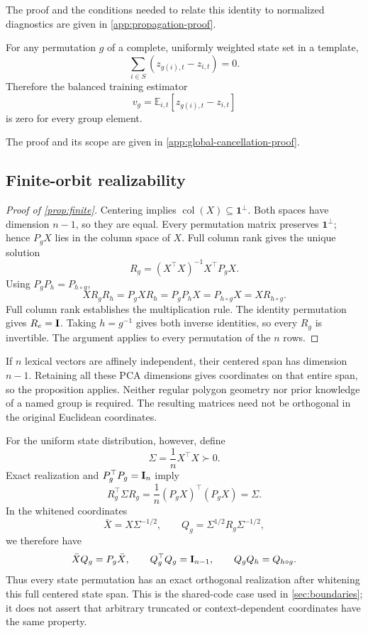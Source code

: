 The proof and the conditions needed to relate this identity
to normalized diagnostics are given in
\cref{app:propagation-proof}.

\begin{proposition}
\label{prop:additive}
For any permutation $g$ of a complete, uniformly weighted
state set in a template,
\[
 \sum_{i\in S}(z_{g(i),t}-z_{i,t})=0.
\]
Therefore the balanced training estimator
\[
 v_g=\mathbb E_{i,t}
       [z_{g(i),t}-z_{i,t}]
\]
is zero for every group element.
\end{proposition}

The proof and its scope are given in
\cref{app:global-cancellation-proof}.


\subsection{Finite-orbit realizability}
\label{app:finite-orbit-proof}

\begin{proof}[Proof of \cref{prop:finite}]
Centering implies
$\operatorname{col}(X)\subseteq\mathbf1^\perp$.
Both spaces have dimension $n-1$, so they are equal.
Every permutation matrix preserves $\mathbf1^\perp$;
hence $P_gX$ lies in the column space of $X$.
Full column rank gives the unique solution
\[
 R_g=(X^\top X)^{-1}X^\top P_gX.
\]
Using $P_gP_h=P_{h\circ g}$,
\[
 XR_gR_h
 =P_gXR_h
 =P_gP_hX
 =P_{h\circ g}X
 =XR_{h\circ g}.
\]
Full column rank establishes the multiplication rule.
The identity permutation gives $R_e=\mathbf{I}$.
Taking $h=g^{-1}$ gives both inverse identities, so every
$R_g$ is invertible.
The argument applies to every permutation of the $n$ rows.
\end{proof}

If $n$ lexical vectors are affinely independent, their
centered span has dimension $n-1$.
Retaining all these PCA dimensions gives coordinates on
that entire span, so the proposition applies.
Neither regular polygon geometry nor prior knowledge of a
named group is required.
The resulting matrices need not be orthogonal in the
original Euclidean coordinates.

For the uniform state distribution, however, define
\[
 \Sigma=\frac1nX^\top X\succ0.
\]
Exact realization and $P_g^\top P_g=\mathbf{I}_n$ imply
\[
 R_g^\top\Sigma R_g
 =\frac1n(P_gX)^\top(P_gX)
 =\Sigma.
\]
In the whitened coordinates
\[
 \bar X=X\Sigma^{-1/2},
 \qquad
 Q_g=\Sigma^{1/2}R_g\Sigma^{-1/2},
\]
we therefore have
\[
 \bar XQ_g=P_g\bar X,
 \qquad
 Q_g^\top Q_g=\mathbf{I}_{n-1},
 \qquad
 Q_gQ_h=Q_{h\circ g}.
\]
Thus every state permutation has an exact orthogonal
realization after whitening this full centered state span.
This is the shared-code case used in
\cref{sec:boundaries}; it does not assert that arbitrary
truncated or context-dependent coordinates have the same
property.

